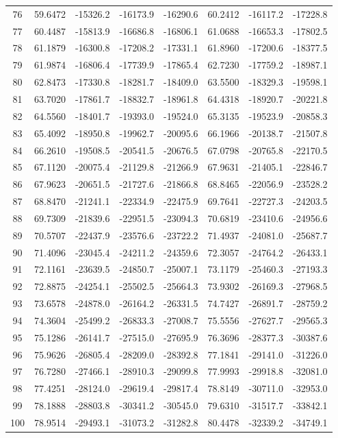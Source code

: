 \begin{table}[]
\begin{tabular}{c|cccc|ccc}
76	&	59.6472	&	-15326.2	&	-16173.9	&	-16290.6	&	60.2412	&	-16117.2	&	-17228.8	\\
77	&	60.4487	&	-15813.9	&	-16686.8	&	-16806.1	&	61.0688	&	-16653.3	&	-17802.5	\\
78	&	61.1879	&	-16300.8	&	-17208.2	&	-17331.1	&	61.8960	&	-17200.6	&	-18377.5	\\
79	&	61.9874	&	-16806.4	&	-17739.9	&	-17865.4	&	62.7230	&	-17759.2	&	-18987.1	\\
80	&	62.8473	&	-17330.8	&	-18281.7	&	-18409.0	&	63.5500	&	-18329.3	&	-19598.1	\\
81	&	63.7020	&	-17861.7	&	-18832.7	&	-18961.8	&	64.4318	&	-18920.7	&	-20221.8	\\
82	&	64.5560	&	-18401.7	&	-19393.0	&	-19524.0	&	65.3135	&	-19523.9	&	-20858.3	\\
83	&	65.4092	&	-18950.8	&	-19962.7	&	-20095.6	&	66.1966	&	-20138.7	&	-21507.8	\\
84	&	66.2610	&	-19508.5	&	-20541.5	&	-20676.5	&	67.0798	&	-20765.8	&	-22170.5	\\
85	&	67.1120	&	-20075.4	&	-21129.8	&	-21266.9	&	67.9631	&	-21405.1	&	-22846.7	\\
86	&	67.9623	&	-20651.5	&	-21727.6	&	-21866.8	&	68.8465	&	-22056.9	&	-23528.2	\\
87	&	68.8470	&	-21241.1	&	-22334.9	&	-22475.9	&	69.7641	&	-22727.3	&	-24203.5	\\
88	&	69.7309	&	-21839.6	&	-22951.5	&	-23094.3	&	70.6819	&	-23410.6	&	-24956.6	\\
89	&	70.5707	&	-22437.9	&	-23576.6	&	-23722.2	&	71.4937	&	-24081.0	&	-25687.7	\\
90	&	71.4096	&	-23045.4	&	-24211.2	&	-24359.6	&	72.3057	&	-24764.2	&	-26433.1	\\
91	&	72.1161	&	-23639.5	&	-24850.7	&	-25007.1	&	73.1179	&	-25460.3	&	-27193.3	\\
92	&	72.8875	&	-24254.1	&	-25502.5	&	-25664.3	&	73.9302	&	-26169.3	&	-27968.5	\\
93	&	73.6578	&	-24878.0	&	-26164.2	&	-26331.5	&	74.7427	&	-26891.7	&	-28759.2	\\
94	&	74.3604	&	-25499.2	&	-26833.3	&	-27008.7	&	75.5556	&	-27627.7	&	-29565.3	\\
95	&	75.1286	&	-26141.7	&	-27515.0	&	-27695.9	&	76.3696	&	-28377.3	&	-30387.6	\\
96	&	75.9626	&	-26805.4	&	-28209.0	&	-28392.8	&	77.1841	&	-29141.0	&	-31226.0	\\
97	&	76.7280	&	-27466.1	&	-28910.3	&	-29099.8	&	77.9993	&	-29918.8	&	-32081.0	\\
98	&	77.4251	&	-28124.0	&	-29619.4	&	-29817.4	&	78.8149	&	-30711.0	&	-32953.0	\\
99	&	78.1888	&	-28803.8	&	-30341.2	&	-30545.0	&	79.6310	&	-31517.7	&	-33842.1	\\
100	&	78.9514	&	-29493.1	&	-31073.2	&	-31282.8	&	80.4478	&	-32339.2	&	-34749.1	\\


\end{tabular}
\end{table}
